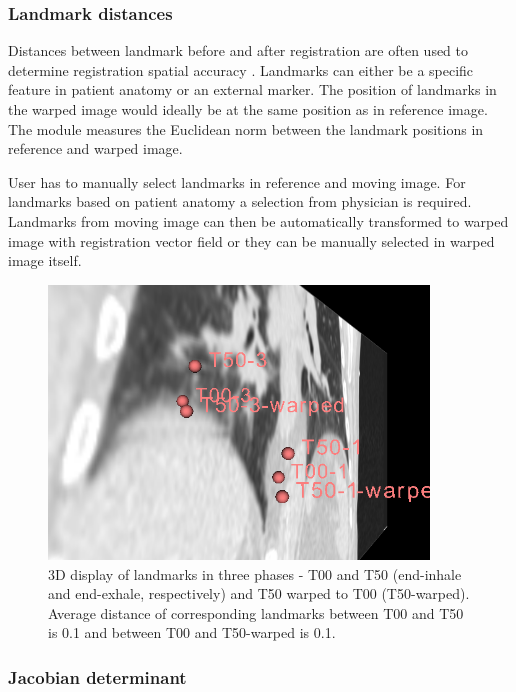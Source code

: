 \documentclass[type=dr, dr=rernat, accentcolor=tud7b,colorbacktitle, bigchapter, openright, twoside, 12pt ]{tudthesis}
\begin{document}
\subsubsection{Landmark distances}

Distances between landmark before and after registration are often used to determine registration spatial accuracy \cite{Castillo2009}. Landmarks can either be a specific feature in patient anatomy or an external marker. The position of landmarks in the warped image would ideally be at the same position as in reference image. The module measures the Euclidean norm between the landmark positions in reference and warped image.

User has to manually select landmarks in reference and moving image. For landmarks based on patient anatomy a selection from physician is required. Landmarks from moving image can then be automatically transformed to warped image with registration vector field or they can be manually selected in warped image itself.

\begin{figure}[H]
\begin{center}
\includegraphics[width=0.9\textwidth]{./Images/landmark.png}
\caption{3D display of landmarks in three phases - T00 and T50 (end-inhale and end-exhale, respectively) and T50 warped to T00 (T50-warped). Average distance of corresponding landmarks between T00 and T50 is 0.1 and between T00 and T50-warped is 0.1.}
\label{inv}
\end{center}
\end{figure}


\subsubsection{Jacobian determinant}
\label{Jacobian}
\end{document}
